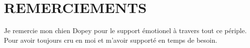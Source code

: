 %
\chapter*{REMERCIEMENTS}\thispagestyle{headings}
%
Je remercie mon chien Dopey pour le support émotionel à travers tout ce périple. Pour avoir toujours cru en moi et m'avoir supporté en temps de besoin.